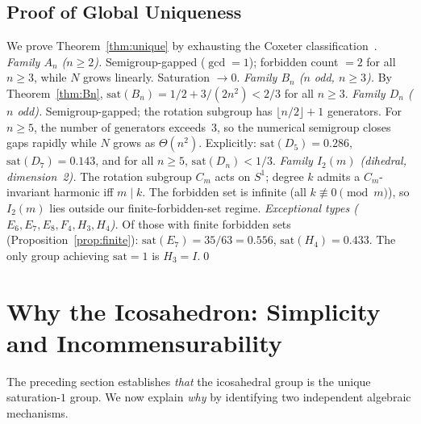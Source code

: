 \documentclass[11pt,letterpaper]{article}
\theoremstyle{definition}
\begin{document}
\subsection{Proof of Global Uniqueness}\label{sec:higher-dim}
We prove Theorem~\ref{thm:unique} by exhausting the Coxeter classification~\cite{Humphreys90}.
\emph{Family $A_n$ ($n\ge2$).}  Semigroup-gapped ($\gcd=1$); forbidden count $=2$ for all $n\ge3$, while $N$ grows linearly.  Saturation $\to0$.
\emph{Family $B_n$ ($n$ odd, $n\ge3$).}  By Theorem~\ref{thm:Bn}, $\mathrm{sat}(B_n)=1/2+3/(2n^2)<2/3$ for all $n\ge3$.
\emph{Family $D_n$ ($n$ odd).}  Semigroup-gapped; the rotation subgroup has $\lfloor n/2\rfloor+1$ generators.  For $n\ge5$, the number of generators exceeds~3, so the numerical semigroup closes gaps rapidly while $N$ grows as $\Theta(n^2)$.  Explicitly: $\mathrm{sat}(D_5)=0.286$, $\mathrm{sat}(D_7)=0.143$, and for all $n\ge5$, $\mathrm{sat}(D_n)<1/3$.
\emph{Family $I_2(m)$ (dihedral, dimension~2).}  The rotation subgroup $C_m$ acts on $S^1$; degree $k$ admits a $C_m$-invariant harmonic iff $m\mid k$.  The forbidden set is infinite (all $k\not\equiv0\pmod{m}$), so $I_2(m)$ lies outside our finite-forbidden-set regime.
\emph{Exceptional types ($E_6,E_7,E_8,F_4,H_3,H_4$).}  Of those with finite forbidden sets (Proposition~\ref{prop:finite}): $\mathrm{sat}(E_7)=35/63=0.556$, $\mathrm{sat}(H_4)=0.433$.
The only group achieving $\mathrm{sat}=1$ is $H_3=I$.\qed
\section{Why the Icosahedron: Simplicity and Incommensurability}\label{sec:why}
The preceding section establishes \emph{that} the icosahedral group is the unique saturation-$1$ group.  We now explain \emph{why} by identifying two independent algebraic mechanisms.
\end{document}
